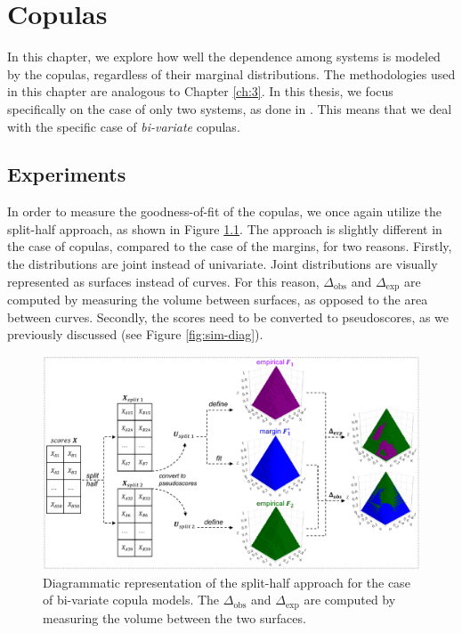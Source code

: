 \chapter{Copulas}\label{ch:4}

In this chapter, we explore how well the dependence among systems is modeled by the copulas, regardless of their marginal distributions. The methodologies used in this chapter are analogous to Chapter \ref{ch:3}. In this thesis, we focus specifically on the case of only two systems, as done in \cite{Urbano2019}. This means that we deal with the specific case of \textit{bi-variate} copulas. 

\section{Experiments}

In order to measure the goodness-of-fit of the copulas, we once again utilize the split-half approach, as shown in Figure \ref{fig:diag6}. The approach is slightly different in the case of copulas, compared to the case of the margins, for two reasons. Firstly, the distributions are joint instead of univariate. Joint distributions are visually represented as surfaces instead of curves. For this reason, $\Delta_\text{obs}$ and $\Delta_\text{exp}$ are computed by measuring the volume between surfaces, as opposed to the area between curves. Secondly, the scores need to be converted to pseudoscores, as we previously discussed (see Figure \ref{fig:sim-diag}). 

\begin{figure}[h]
	\centering	
	\includegraphics[width=1.0\linewidth]{../diagrams/diag6}
	\caption{Diagrammatic representation of the split-half approach for the case of bi-variate copula models. The $\Delta_\text{obs}$ and $\Delta_\text{exp}$ are computed by measuring the volume between the two surfaces.}
	\label{fig:diag6}
\end{figure}

